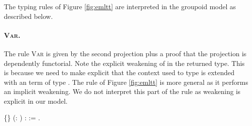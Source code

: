   The typing rules of Figure \ref{fig:emltt} are
  interpreted in the groupoid model as described below.


  \paragraph{\textsc{Var}.} 


  The rule \textsc{Var} is given by the second projection plus a proof
  that the projection is dependently functorial. Note the explicit
  weakening of  in the returned type. This is because we need to
  make explicit that the context used to type  is extended with an
  term of type . The rule of Figure \ref{fig:emltt} is more general 
  as it performs an implicit weakening. We do not interpret this part of 
  the rule as weakening is explicit in our model. 


\begin{coqdoccode}
\coqdocemptyline
\coqdocnoindent
{}  \{\} (: ) :   := \coqdocnotation{(}   \coqdocnotation{;}  \coqdocnotation{)}.\coqdoceol
\coqdocemptyline
\coqdocemptyline
\end{coqdoccode}
